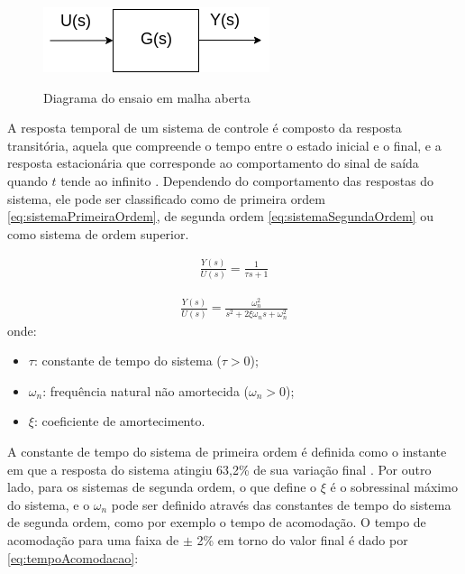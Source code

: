 \begin{figure}[ht]
  \centering
  \caption{Diagrama do ensaio em malha aberta}
  \includegraphics[width = 0.4\columnwidth]{Imagens/diagEnsaioMA.png}
  \label{fig:diagEnsaioMA} 
\end{figure}

A resposta temporal de um sistema de controle é composto da resposta transitória, aquela que compreende o tempo entre o 
estado inicial e o final, e a resposta estacionária que corresponde ao comportamento do sinal de saída quando $t$
tende ao infinito \cite{Ogata}. Dependendo do comportamento das respostas do sistema, ele pode ser classificado
como de primeira ordem \eqref{eq:sistemaPrimeiraOrdem}, de segunda ordem \eqref{eq:sistemaSegundaOrdem} ou como sistema 
de ordem superior.

\begin{equation}
  \begin{gathered}
    \frac{Y(s)}{U(s)} = \frac{1}{\tau s + 1}
  \end{gathered}
  \label{eq:sistemaPrimeiraOrdem}
\end{equation}

\begin{equation}
  \begin{gathered}
    \frac{Y(s)}{U(s)} = \frac{\omega_n^2}{s^2 + 2\xi \omega_n s + \omega_n^2}
  \end{gathered}
  \label{eq:sistemaSegundaOrdem}
\end{equation}
onde:

\begin{itemize}
 \item $\tau$: constante de tempo do sistema ($\tau > 0$);
 \item $\omega_n$: frequência natural não amortecida ($\omega_n > 0$);
 \item $\xi$: coeficiente de amortecimento.
\end{itemize}

A constante de tempo do sistema de primeira ordem é definida como o instante em que a resposta 
do sistema atingiu 63,2\% de sua variação final \cite{Castrucci}. Por outro lado, para os sistemas de
segunda ordem, o que define o $\xi$ é o sobressinal máximo do sistema, e o $\omega_n$ pode ser definido
através das constantes de tempo do sistema de segunda ordem, como por exemplo o tempo de 
acomodação. O tempo de acomodação para uma faixa de $\pm$ 2\% em torno do valor final é dado 
por \eqref{eq:tempoAcomodacao}:


